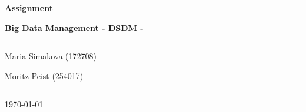 \documentclass[12pt]{article}
\begin{document}
\begin{titlepage}
	\centering
	\par\vspace{0.75cm}
	{\huge\bfseries Assignment~\nass\par}
    {\large\bfseries Big Data Management - DSDM -~\gr\par}
	\vspace{0.25cm}
    \noindent\rule{\textwidth}{1pt}
    {\Large Maria Simakova (172708)\par}
	{\Large Moritz Peist (254017)\par}
    \noindent\rule{\textwidth}{1pt}
	\vfill
	{\large \today\par}
\end{titlepage}



\newpage

\end{document}
